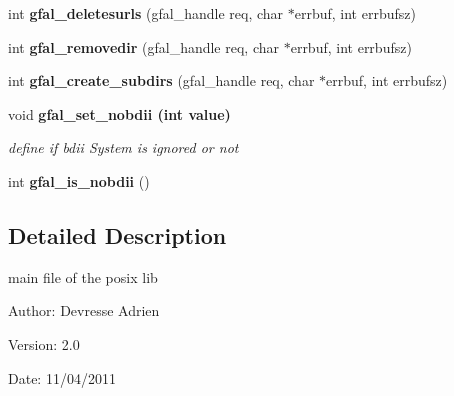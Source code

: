 \begin{CompactItemize}
\item 
int \textbf{gfal\_\-deletesurls} (gfal\_\-handle req, char $\ast$errbuf, int errbufsz)\label{gfal__posix_8c_72e48640200202bb9e9cf47e8a71f942}

\item 
int \textbf{gfal\_\-removedir} (gfal\_\-handle req, char $\ast$errbuf, int errbufsz)\label{gfal__posix_8c_8482ace6bde89a99f66d52bb66e012d9}

\item 
int \textbf{gfal\_\-create\_\-subdirs} (gfal\_\-handle req, char $\ast$errbuf, int errbufsz)\label{gfal__posix_8c_2a4f0aab963f1f1006953333907ecdbb}

\item 
void \bf{gfal\_\-set\_\-nobdii} (int value)
\begin{CompactList}\small\item\em define if bdii System is ignored or not \item\end{CompactList}\item 
int \textbf{gfal\_\-is\_\-nobdii} ()\label{group__internal__group_g0d2a0557bdb571ccb85c6ab5c05ae56f}

\end{CompactItemize}


\subsection{Detailed Description}
main file of the posix lib 

\begin{Desc}
\item[Author:]Devresse Adrien \end{Desc}
\begin{Desc}
\item[Version:]2.0 \end{Desc}
\begin{Desc}
\item[Date:]11/04/2011 \end{Desc}
